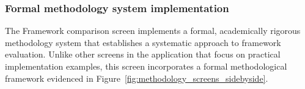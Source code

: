 \FloatBarrier

\subsubsection{Formal methodology system implementation}

The Framework comparison screen implements a formal, academically rigorous methodology system that establishes a systematic approach to framework evaluation. Unlike other screens in the application that focus on practical implementation examples, this screen incorporates a formal methodological framework evidenced in Figure~\ref{fig:methodology_screens_sidebyside}.

\begin{figure}[ht]
    \centering
    \begin{subfigure}[b]{0.48\textwidth}
        \centering

\end{subfigure}
\end{figure}
